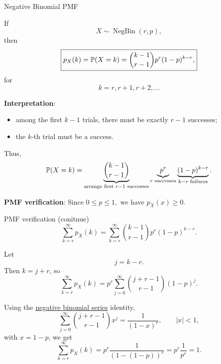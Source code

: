 \begin{frame}{Negative Binomial PMF}

\small



\begin{tcolorbox}[
enhanced,
colback=white,
colframe=blue!70!black,
drop shadow,
arc=2mm,
boxrule=0.8pt
]
If
\[
X\sim\operatorname{NegBin}(r,p),
\]
then
\[
\boxed{
p_X(k) = \mathbb{P}(X=k)
=
\binom{k-1}{r-1}
p^r(1-p)^{k-r},
}
\]
for
\[
k=r,r+1,r+2,\dots
\]
\end{tcolorbox}












\textbf{Interpretation}:
\begin{itemize}
\item among the first \(k-1\) trials, there must be exactly \(r-1\) successes;
\item the \(k\)-th trial must be a success.
\end{itemize}

Thus,
\[
\mathbb{P}(X=k)
=
\underbrace{\binom{k-1}{r-1}}_{\text{arrange first }r-1\text{ successes}}
\underbrace{p^r}_{r\text{ successes}}
\underbrace{(1-p)^{k-r}}_{k-r\text{ failures}}.
\]

\textbf{PMF verification}: Since $0\le p\le1,$ we have $p_X(x)\ge0.
$
\end{frame}



\begin{frame}{PMF verification (conitnue)}
    \[
\sum_{k=r}^{\infty}p_X(k)
=
\sum_{k=r}^{\infty}
\binom{k-1}{r-1}
p^r(1-p)^{k-r}.
\]

Let
\[
j=k-r.
\]
Then \(k=j+r\), so
\[
\sum_{k=r}^{\infty}p_X(k)
=
p^r
\sum_{j=0}^{\infty}
\binom{j+r-1}{r-1}
(1-p)^j.
\]

Using the  \href{https://mathworld.wolfram.com/NegativeBinomialSeries.html}{negative binomial series} identity,
\[
\sum_{j=0}^{\infty}
\binom{j+r-1}{r-1}
x^j
=
\frac{1}{(1-x)^r},
\qquad |x|<1,
\]
with \(x=1-p\), we get
\[
\sum_{k=r}^{\infty}p_X(k)
=
p^r
\frac{1}{(1-(1-p))^r}
=
p^r\frac1{p^r}
=
1.
\]
\end{frame}









